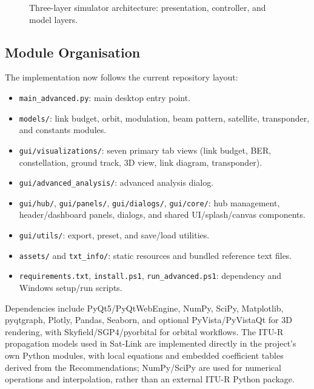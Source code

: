 \documentclass[conference]{IEEEtran}
\begin{document}
\begin{figure}[!t]
\caption{Three-layer simulator architecture: presentation, controller,
  and model layers.}
\label{fig:arch}
\end{figure}

\subsection{Module Organisation}

The implementation now follows the current repository layout:
\begin{itemize}[leftmargin=*,nosep]
  \item \texttt{main\_advanced.py}: main desktop entry point.
  \item \texttt{models/}: link budget, orbit, modulation, beam pattern,
        satellite, transponder, and constants modules.
  \item \texttt{gui/visualizations/}: seven primary tab views
        (link budget, BER, constellation, ground track, 3D view,
        link diagram, transponder).
  \item \texttt{gui/advanced\_analysis/}: advanced analysis dialog.
  \item \texttt{gui/hub/}, \texttt{gui/panels/}, \texttt{gui/dialogs/},
        \texttt{gui/core/}: hub management, header/dashboard panels,
        dialogs, and shared UI/splash/canvas components.
  \item \texttt{gui/utils/}: export, preset, and save/load utilities.
  \item \texttt{assets/} and \texttt{txt\_info/}: static resources and
        bundled reference text files.
  \item \texttt{requirements.txt}, \texttt{install.ps1},
        \texttt{run\_advanced.ps1}: dependency and Windows setup/run scripts.
\end{itemize}

Dependencies include PyQt5/PyQtWebEngine, NumPy, SciPy, Matplotlib,
pyqtgraph, Plotly, Pandas, Seaborn, and optional PyVista/PyVistaQt for
3D rendering, with Skyfield/SGP4/pyorbital for orbital workflows.
The ITU-R propagation models used in Sat-Link are implemented directly
in the project's own Python modules, with local equations and embedded
coefficient tables derived from the Recommendations; NumPy/SciPy are used
for numerical operations and interpolation, rather than an external ITU-R
Python package.
\end{document}
